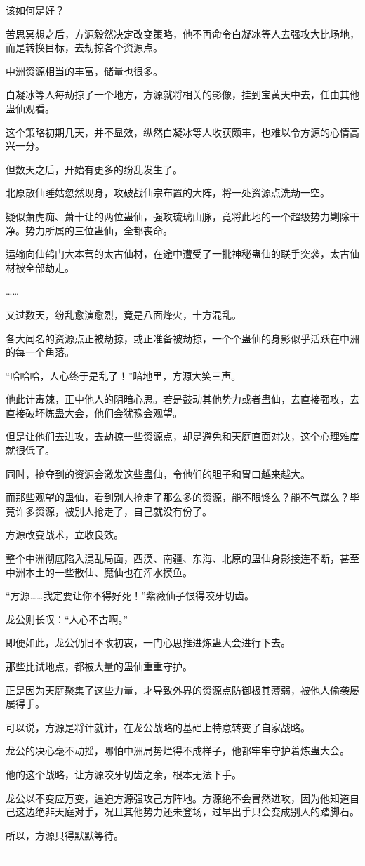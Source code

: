 \begin{this_body}
该如何是好？

苦思冥想之后，方源毅然决定改变策略，他不再命令白凝冰等人去强攻大比场地，而是转换目标，去劫掠各个资源点。

中洲资源相当的丰富，储量也很多。

白凝冰等人每劫掠了一个地方，方源就将相关的影像，挂到宝黄天中去，任由其他蛊仙观看。

这个策略初期几天，并不显效，纵然白凝冰等人收获颇丰，也难以令方源的心情高兴一分。

但数天之后，开始有更多的纷乱发生了。

北原散仙睡姑忽然现身，攻破战仙宗布置的大阵，将一处资源点洗劫一空。

疑似萧虎痴、萧十让的两位蛊仙，强攻琉璃山脉，竟将此地的一个超级势力剿除干净。势力所属的三位蛊仙，全都丧命。

运输向仙鹤门大本营的太古仙材，在途中遭受了一批神秘蛊仙的联手突袭，太古仙材被全部劫走。

……

又过数天，纷乱愈演愈烈，竟是八面烽火，十方混乱。

各大闻名的资源点正被劫掠，或正准备被劫掠，一个个蛊仙的身影似乎活跃在中洲的每一个角落。

“哈哈哈，人心终于是乱了！”暗地里，方源大笑三声。

他此计毒辣，正中他人的阴暗心思。若是鼓动其他势力或者蛊仙，去直接强攻，去直接破坏炼蛊大会，他们会犹豫会观望。

但是让他们去进攻，去劫掠一些资源点，却是避免和天庭直面对决，这个心理难度就很低了。

同时，抢夺到的资源会激发这些蛊仙，令他们的胆子和胃口越来越大。

而那些观望的蛊仙，看到别人抢走了那么多的资源，能不眼馋么？能不气躁么？毕竟许多资源，被别人抢走了，自己就没有份了。

方源改变战术，立收良效。

整个中洲彻底陷入混乱局面，西漠、南疆、东海、北原的蛊仙身影接连不断，甚至中洲本土的一些散仙、魔仙也在浑水摸鱼。

“方源……我定要让你不得好死！”紫薇仙子恨得咬牙切齿。

龙公则长叹：“人心不古啊。”

即便如此，龙公仍旧不改初衷，一门心思推进炼蛊大会进行下去。

那些比试地点，都被大量的蛊仙重重守护。

正是因为天庭聚集了这些力量，才导致外界的资源点防御极其薄弱，被他人偷袭屡屡得手。

可以说，方源是将计就计，在龙公战略的基础上特意转变了自家战略。

龙公的决心毫不动摇，哪怕中洲局势烂得不成样子，他都牢牢守护着炼蛊大会。

他的这个战略，让方源咬牙切齿之余，根本无法下手。

龙公以不变应万变，逼迫方源强攻己方阵地。方源绝不会冒然进攻，因为他知道自己这边绝非天庭对手，况且其他势力还未登场，过早出手只会变成别人的踏脚石。

所以，方源只得默默等待。

------------

\end{this_body}

